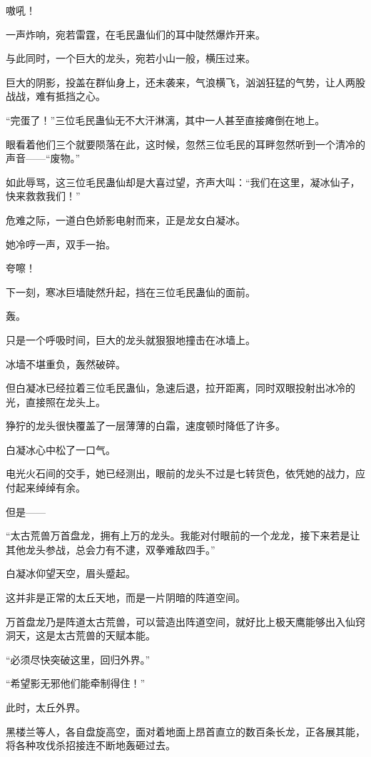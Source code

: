 
\begin{this_body}

嗷吼！

一声炸响，宛若雷霆，在毛民蛊仙们的耳中陡然爆炸开来。

与此同时，一个巨大的龙头，宛若小山一般，横压过来。

巨大的阴影，投盖在群仙身上，还未袭来，气浪横飞，汹汹狂猛的气势，让人两股战战，难有抵挡之心。

“完蛋了！”三位毛民蛊仙无不大汗淋漓，其中一人甚至直接瘫倒在地上。

眼看着他们三个就要陨落在此，这时候，忽然三位毛民的耳畔忽然听到一个清冷的声音——“废物。”

如此辱骂，这三位毛民蛊仙却是大喜过望，齐声大叫：“我们在这里，凝冰仙子，快来救救我们！”

危难之际，一道白色娇影电射而来，正是龙女白凝冰。

她冷哼一声，双手一抬。

夸嚓！

下一刻，寒冰巨墙陡然升起，挡在三位毛民蛊仙的面前。

轰。

只是一个呼吸时间，巨大的龙头就狠狠地撞击在冰墙上。

冰墙不堪重负，轰然破碎。

但白凝冰已经拉着三位毛民蛊仙，急速后退，拉开距离，同时双眼投射出冰冷的光，直接照在龙头上。

狰狞的龙头很快覆盖了一层薄薄的白霜，速度顿时降低了许多。

白凝冰心中松了一口气。

电光火石间的交手，她已经测出，眼前的龙头不过是七转货色，依凭她的战力，应付起来绰绰有余。

但是——

“太古荒兽万首盘龙，拥有上万的龙头。我能对付眼前的一个龙龙，接下来若是让其他龙头参战，总会力有不逮，双拳难敌四手。”

白凝冰仰望天空，眉头蹙起。

这并非是正常的太丘天地，而是一片阴暗的阵道空间。

万首盘龙乃是阵道太古荒兽，可以营造出阵道空间，就好比上极天鹰能够出入仙窍洞天，这是太古荒兽的天赋本能。

“必须尽快突破这里，回归外界。”

“希望影无邪他们能牵制得住！”

此时，太丘外界。

黑楼兰等人，各自盘旋高空，面对着地面上昂首直立的数百条长龙，正各展其能，将各种攻伐杀招接连不断地轰砸过去。


\end{this_body}
